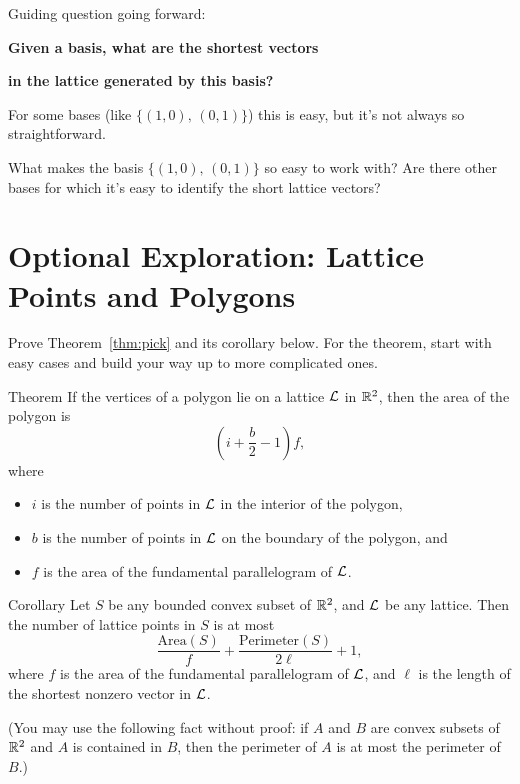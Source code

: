 \noindent
Guiding question going forward:

\begin{center}
	\textbf{Given a basis, what are the shortest vectors}
		
	\textbf{in the lattice generated by this basis?}
\end{center}
\noindent
For some bases (like $\{(1,0),\, (0,1)\}$) this is easy, but it's not always so straightforward.

\begin{explor}
	What makes the basis $\{(1,0),\, (0,1)\}$ so easy to work with? Are there other bases for which it's easy to identify the short lattice vectors?
\end{explor}

\section*{Optional Exploration: Lattice Points and Polygons}

\begin{explor}
	Prove Theorem~\ref{thm:pick} and its corollary below. For the theorem, start with easy cases and build your way up to more complicated ones.
\end{explor}

\begin{toprove}{Theorem}\label{thm:pick}
	If the vertices of a polygon lie on a lattice $\mathcal{L}$ in $\mathbb{R}^2$, then the area of the polygon is
	\[\left(i+\frac{b}{2}-1\right)f,\]
	where 
	\begin{itemize}
		\item $i$ is the number of points in $\mathcal{L}$ in the interior of the polygon, 
		\item $b$ is the number of points in $\mathcal{L}$ on the boundary of the polygon, and 
		\item $f$ is the area of the fundamental parallelogram of $\mathcal{L}$.
	\end{itemize}
\end{toprove}

\begin{toprove}{Corollary}\label{cor:pickcor}
	Let $S$ be any bounded convex subset of $\mathbb{R}^2$, and $\mathcal{L}$ be any lattice. Then the number of lattice points in $S$ is at most
	\[\frac{\text{Area}(S)}{f}+\frac{\text{Perimeter}(S)}{2\ell}+1,\]
	where $f$ is the area of the fundamental parallelogram of $\mathcal{L}$, and $\ell$ is the length of the shortest nonzero vector in $\mathcal{L}$. 
	
	\color{DarkBlue}(You may use the following fact without proof: if $A$ and $B$ are convex subsets of $\mathbb{R}^2$ and $A$ is contained in $B$, then the perimeter of $A$ is at most the perimeter of $B$.)
\end{toprove}

